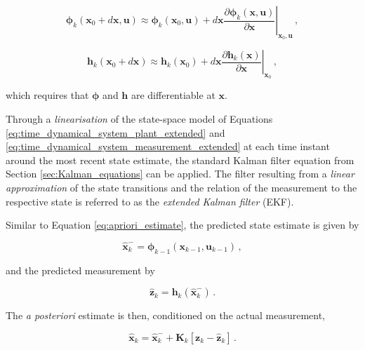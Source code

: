 \begin{equation}\label{eq:linear_phi}
  \bm{\phi}_{k}(\mathbf{x}_0 + d \mathbf{x}, \mathbf{u}) \approx \bm{\phi}_{k}(\mathbf{x}_0, \mathbf{u}) + d \mathbf{x} \left. \frac{\partial \bm{\phi}_{k}(\mathbf{x}, \mathbf{u})}{\partial \mathbf{x}} \right|_{\mathbf{x}_0, \mathbf{u}}\,,
\end{equation}

\begin{equation}\label{eq:linear_h}
  \mathbf{h}_{k}(\mathbf{x}_0 + d \mathbf{x}) \approx \mathbf{h}_{k}(\mathbf{x}_0) + d \mathbf{x} \left. \frac{\partial \mathbf{h}_{k}(\mathbf{x})}{\partial \mathbf{x}} \right|_{\mathbf{x}_0}\,,
\end{equation}

\noindent
which requires that $\bm{\phi}$ and $\mathbf{h}$ are differentiable at $\mathbf{x}$.

Through a \emph{linearisation} of the state-space model of Equations \ref{eq:time_dynamical_system_plant_extended} and \ref{eq:time_dynamical_system_measurement_extended} at each time instant around the most recent state estimate, the standard Kalman filter equation from Section \ref{sec:Kalman_equations} can be applied. The filter resulting from a \emph{linear approximation} of the state transitions and the relation of the measurement to the respective state is referred to as the \emph{extended Kalman filter} (EKF).

Similar to Equation \ref{eq:apriori_estimate}, the predicted state estimate is given by

\begin{equation}\label{eq:apriori_estimate_extended}
  \hat{\mathbf{x}}^{-}_k = \bm{\phi}_{k-1}(\mathbf{x}_{k-1}, \mathbf{u}_{k-1})\,,
\end{equation}

\noindent
and the predicted measurement by

\begin{equation}\label{eq:predicted_measurement_extended}
  \hat{\mathbf{z}}_k = \mathbf{h}_{k}(\hat{\mathbf{x}}^{-}_{k})\,.
\end{equation}

\noindent
The \emph{a posteriori} estimate is then, conditioned on the actual measurement, 

\begin{equation}\label{eq:aposteriori_estimate_extended}
  \hat{\mathbf{x}}_k = \hat{\mathbf{x}}^-_k + \mathbf{K}_{k}[\mathbf{z}_k-\hat{\mathbf{z}}_k]\,.
\end{equation}

